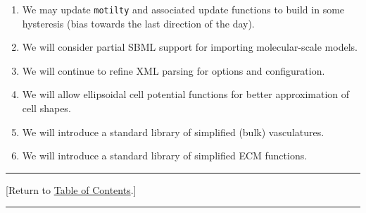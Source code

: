 \documentclass[12pt]{article}
\renewcommand{\v}{\verb}
\newcommand{\blue}[1]{\textcolor{blue}{#1}}
\newcommand{\DONE}{}%
\newcommand{\TOClink}{\begin{center}\hrule\vskip-5pt\phantom{.}\hfill[Return to \hyperlink{TOC}{Table of Contents}.]\hfill\phantom{.}\vskip3pt\hrule\end{center}}
\begin{document}
\begin{enumerate}
\item 
We may update \v|motilty| and associated update functions to 
build in some hysteresis (bias towards the last direction of the day).

\item 
We will consider partial SBML support for importing molecular-scale models. 

\item 
We will continue to refine XML parsing for options and configuration. 

\item 
We will allow ellipsoidal cell potential functions for better approximation of cell shapes. 

\item 
We will introduce  a standard library of simplified (bulk) vasculatures. 

\item 
We will introduce a standard library of simplified ECM functions. 

\end{enumerate}

\TOClink 






\end{document}
